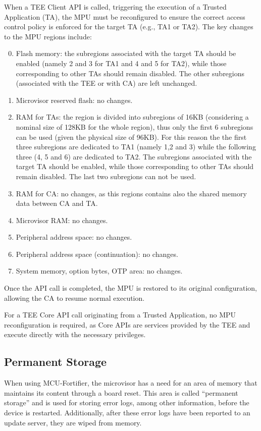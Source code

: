 \documentclass{article}
\begin{document}
When a TEE Client API is called, triggering the execution of a Trusted Application (TA), the MPU must be reconfigured to ensure the correct access control policy is enforced for the target TA (e.g., TA1 or TA2). The key changes to the MPU regions include:
\begin{enumerate}
    \setcounter{enumi}{-1}
    \item Flash memory: the subregions associated with the target TA should be enabled (namely 2 and 3 for TA1 and 4 and 5 for TA2), while those corresponding to other TAs should remain disabled. The other subregions (associated with the TEE or with CA) are left unchanged.
    \item Microvisor reserved flash: no changes.
    \item RAM for TAs: the region is divided into subregions of 16KB (considering a nominal size of 128KB for the whole region), thus only the first 6 subregions can be used (given the physical size of 96KB). For this reason the the first three subregions are dedicated to TA1 (namely 1,2 and 3) while the following three (4, 5 and 6) are dedicated to TA2. The subregions associated with the target TA should be enabled, while those corresponding to other TAs should remain disabled. The last two subregions can not be used. 
    \item RAM for CA: no changes, as this regions contains also the shared memory data between CA and TA.
    \item Microvisor RAM: no changes.
    \item Peripheral address space: no changes.
    \item Peripheral address space (continuation): no changes.
    \item System memory, option bytes, OTP area: no changes.
\end{enumerate}

Once the API call is completed, the MPU is restored to its original configuration, allowing the CA to resume normal execution.

For a TEE Core API call originating from a Trusted Application, no MPU reconfiguration is required, as Core APIs are services provided by the TEE and execute directly with the necessary privileges.

\subsection{Permanent Storage}
\label{subsec:permanent_storage}
When using MCU-Fortifier, the microvisor has a need for an area of memory that maintains its content through a board reset. This area is called ``permanent storage'' and is used for storing error logs, among other information, before the device is restarted. Additionally, after these error logs have been reported to an update server, they are wiped from memory.
\end{document}
